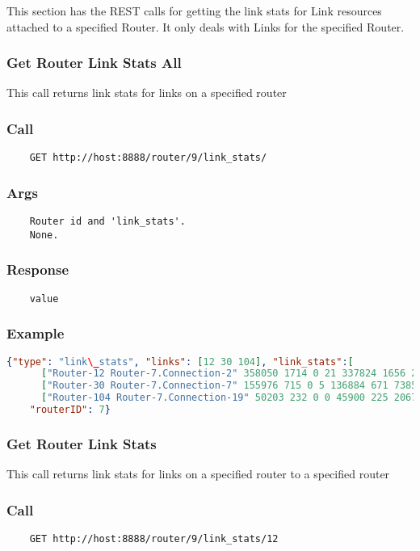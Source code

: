 This section has the REST calls for getting the link stats for Link resources attached to a specified Router. It only deals with Links for the specified Router.

\hr
\subsubsection{Get Router Link Stats All}
This call returns link stats for links on a specified router
\subsubsection*{Call}
\begin{verbatim}
	GET http://host:8888/router/9/link_stats/
\end{verbatim}

\subsubsection*{Args}
\begin{verbatim}
	Router id and 'link_stats'. 
	None.
\end{verbatim}

\subsubsection*{Response}
\begin{verbatim}
	value
\end{verbatim}

\subsubsection*{Example}
\begin{lstlisting}[language=json]
  {"type": "link\_stats", "links": [12 30 104], "link_stats":[
      ["Router-12 Router-7.Connection-2" 358050 1714 0 21 337824 1656 228431 1078 0 0 205428 1007 0 1 0 1],
      ["Router-30 Router-7.Connection-7" 155976 715 0 5 136884 671 73858 302 0 0 53040 260 0 1 0 2],
      ["Router-104 Router-7.Connection-19" 50203 232 0 0 45900 225 2067 3 0 0 0 0 0 1 0 1] ],
    "routerID": 7}
\end{lstlisting}


\hr
\subsubsection{Get Router Link Stats}
This call returns link stats for links on a specified router to a specified router
\subsubsection*{Call}
\begin{verbatim}
	GET http://host:8888/router/9/link_stats/12
\end{verbatim}

